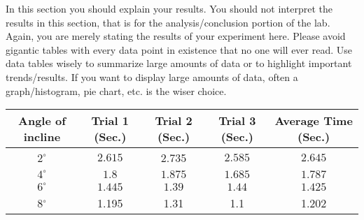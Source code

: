 \documentclass[12pt]{article}
\begin{document}
In this section you should explain your results. You should not interpret the results in this section, that is for the analysis/conclusion portion of the lab. Again, you are merely stating the results of your experiment here. Please avoid gigantic tables with every data point in existence that no one will ever read. Use data tables wisely to summarize large amounts of data or to highlight important trends/results. If you want to display large amounts of data, often a graph/histogram, pie chart, etc. is the wiser choice. 

\begin{center}
\begin{tabular}{|c|c|c|c|c|} %
\hline
Angle of incline & Trial 1 (Sec.) & Trial 2 (Sec.) & Trial 3 (Sec.) & Average Time (Sec.)\\[0.5ex] %
\hline\hline
$2^{\circ}$&$2.615$&$2.73$5&$2.585$&$2.645$\\ %
\hline
$4^{\circ}$&$1.8$&$1.875$&$1.685$&$1.787$\\ %
\hline
$6^{\circ}$&$1.445$&$1.39$&$1.44$&$1.425$\\ %
\hline
8$^{\circ}$&1.195&1.31&1.1&1.202\\ %
\hline
\end{tabular}
\end{center} 
 



\end{document}
